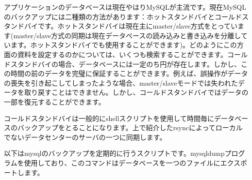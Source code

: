 アプリケーションのデータベースは現在やはりMySQLが主流です。現在MySQLのバックアップには二種類の方法があります：ホットスタンドバイとコールドスタンドバイです。ホットスタンドバイは現在主にmaster/slave方式をとっています(master/slave方式の同期は現在データベースの読み込みと書き込みを分離しています。ホットスタンドバイでも使用することができます)。どのようにこの方面の資料を設定するのかについては、いくつも検索することができます。コールドスタンドバイの場合、データベースには一定のち円が存在します。しかし、この時間の前のデータを完璧に保証することができます。例えば、誤操作がデータの喪失を引き起こしてしまったような場合、master/slaveモードでは失われたデータを取り戻すことはできません。しかし、コールドスタンドバイではデータの一部を復元することができます。

コールドスタンドバイは一般的にshellスクリプトを使用して時間毎にデータベースのバックアップをとることになります。上で紹介したrsyncによってローカルでないデータセンターのサーバの一つに同期します。

以下はmysqlのバックアップを定期的に行うスクリプトです。mysqldumpプログラムを使用しており、このコマンドはデータベースを一つのファイルにエクスポートします。

